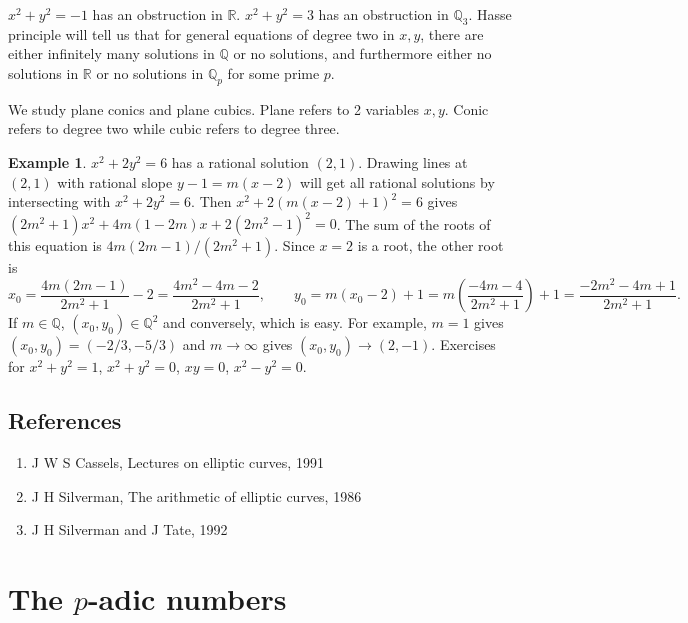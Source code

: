 \documentclass{article}
\newcommand{\Q}{\mathbb{Q}}
\newcommand{\R}{\mathbb{R}}
\newcommand{\rb}[1]{\left( #1 \right)}
\theoremstyle{definition}\newtheorem{definition}{Definition}[section]
\theoremstyle{definition}\newtheorem{remark}[definition]{Remark}
\theoremstyle{definition}\newtheorem*{example}{Example}
\theoremstyle{definition}\newtheorem*{note}{Note}
\begin{document}
$ x^2 + y^2 = -1 $ has an obstruction in $ \R $. $ x^2 + y^2 = 3 $ has an obstruction in $ \Q_3 $. Hasse principle will tell us that for general equations of degree two in $ x, y $, there are either infinitely many solutions in $ \Q $ or no solutions, and furthermore either no solutions in $ \R $ or no solutions in $ \Q_p $ for some prime $ p $.


We study plane conics and plane cubics. Plane refers to 2 variables $ x, y $. Conic refers to degree two while cubic refers to degree three.

\begin{example}
$ x^2 + 2y^2 = 6 $ has a rational solution $ \rb{2, 1} $. Drawing lines at $ \rb{2, 1} $ with rational slope $ y - 1 = m\rb{x - 2} $ will get all rational solutions by intersecting with $ x^2 + 2y^2 = 6 $. Then $ x^2 + 2\rb{m\rb{x - 2} + 1}^2 = 6 $ gives $ \rb{2m^2 + 1}x^2 + 4m\rb{1 - 2m}x + 2\rb{2m^2 - 1}^2 = 0 $. The sum of the roots of this equation is $ 4m\rb{2m - 1} / \rb{2m^2 + 1} $. Since $ x = 2 $ is a root, the other root is
$$ x_0 = \dfrac{4m\rb{2m - 1}}{2m^2 + 1} - 2 = \dfrac{4m^2 - 4m - 2}{2m^2 + 1}, \qquad y_0 = m\rb{x_0 - 2} + 1 = m\rb{\dfrac{-4m - 4}{2m^2 + 1}} + 1 = \dfrac{-2m^2 - 4m + 1}{2m^2 + 1}. $$
If $ m \in \Q $, $ \rb{x_0, y_0} \in \Q^2 $ and conversely, which is easy. For example, $ m = 1 $ gives $ \rb{x_0, y_0} = \rb{-2 / 3, -5 / 3} $ and $ m \to \infty $ gives $ \rb{x_0, y_0} \to \rb{2, -1} $. Exercises for $ x^2 + y^2 = 1 $, $ x^2 + y^2 = 0 $, $ xy = 0 $, $ x^2 - y^2 = 0 $.
\end{example}

\subsection{References}

\begin{enumerate}
\item J W S Cassels, Lectures on elliptic curves, 1991
\item J H Silverman, The arithmetic of elliptic curves, 1986
\item J H Silverman and J Tate, 1992
\end{enumerate}

\pagebreak

\section{The $ p $-adic numbers}
\end{document}
